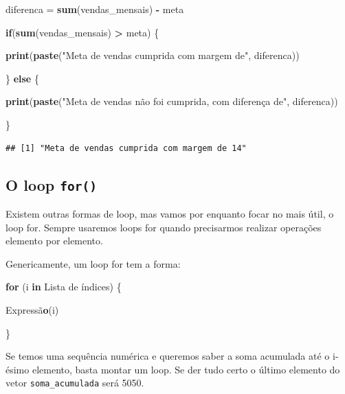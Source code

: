 \documentclass[
]{article}
\newenvironment{Shaded}{\begin{snugshade}}{\end{snugshade}}
\newcommand{\ControlFlowTok}[1]{\textcolor[rgb]{0.13,0.29,0.53}{\textbf{#1}}}
\newcommand{\KeywordTok}[1]{\textcolor[rgb]{0.13,0.29,0.53}{\textbf{#1}}}
\newcommand{\NormalTok}[1]{#1}
\newcommand{\OperatorTok}[1]{\textcolor[rgb]{0.81,0.36,0.00}{\textbf{#1}}}
\newcommand{\StringTok}[1]{\textcolor[rgb]{0.31,0.60,0.02}{#1}}
\begin{document}
\begin{Shaded}
\begin{Highlighting}[]
\NormalTok{diferenca =}\StringTok{ }\KeywordTok{sum}\NormalTok{(vendas_mensais) }\OperatorTok{-}\StringTok{ }\NormalTok{meta}

\ControlFlowTok{if}\NormalTok{(}\KeywordTok{sum}\NormalTok{(vendas_mensais) }\OperatorTok{>}\StringTok{ }\NormalTok{meta) \{}
  
  \KeywordTok{print}\NormalTok{(}\KeywordTok{paste}\NormalTok{(}\StringTok{"Meta de vendas cumprida com margem de"}\NormalTok{, diferenca))}

\NormalTok{\} }\ControlFlowTok{else}\NormalTok{ \{}
  
  \KeywordTok{print}\NormalTok{(}\KeywordTok{paste}\NormalTok{(}\StringTok{"Meta de vendas não foi cumprida, com diferença de"}\NormalTok{, diferenca))  }
  
\NormalTok{  \}}
\end{Highlighting}
\end{Shaded}

\begin{verbatim}
## [1] "Meta de vendas cumprida com margem de 14"
\end{verbatim}

\hypertarget{o-loop-for}{%
\subsection{\texorpdfstring{O loop
\texttt{for()}}{O loop for()}}\label{o-loop-for}}

Existem outras formas de loop, mas vamos por enquanto focar no mais
útil, o loop for. Sempre usaremos loops for quando precisarmos realizar
operações elemento por elemento.

Genericamente, um loop for tem a forma:

\begin{Shaded}
\begin{Highlighting}[]
\ControlFlowTok{for}\NormalTok{ (i }\ControlFlowTok{in}\NormalTok{ Lista de índices) \{}
  
\NormalTok{  Expressã}\KeywordTok{o}\NormalTok{(i)}
  
\NormalTok{  \}}
\end{Highlighting}
\end{Shaded}

Se temos uma sequência numérica e queremos saber a soma acumulada até o
i-ésimo elemento, basta montar um loop. Se der tudo certo o último
elemento do vetor \texttt{soma\_acumulada} será 5050.
\end{document}
